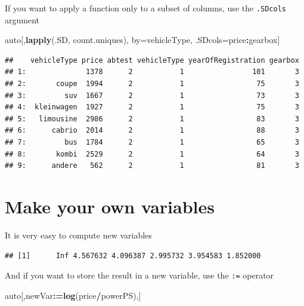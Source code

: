 \documentclass[]{book}
\newenvironment{Shaded}{\begin{snugshade}}{\end{snugshade}}
\newcommand{\CommentTok}[1]{\textcolor[rgb]{0.56,0.35,0.01}{\textit{#1}}}
\newcommand{\ErrorTok}[1]{\textcolor[rgb]{0.64,0.00,0.00}{\textbf{#1}}}
\newcommand{\KeywordTok}[1]{\textcolor[rgb]{0.13,0.29,0.53}{\textbf{#1}}}
\newcommand{\NormalTok}[1]{#1}
\newcommand{\OperatorTok}[1]{\textcolor[rgb]{0.81,0.36,0.00}{\textbf{#1}}}
\newcommand{\StringTok}[1]{\textcolor[rgb]{0.31,0.60,0.02}{#1}}
\theoremstyle{definition}
\theoremstyle{definition}
\theoremstyle{definition}
\theoremstyle{remark}
\begin{document}
If you want to apply a function only to a subset of columns, use the \texttt{.SDcols} argument

\begin{Shaded}
\begin{Highlighting}[]
\NormalTok{auto[,}\KeywordTok{lapply}\NormalTok{(.SD, count.uniques), by=vehicleType, .SDcols=price}\OperatorTok{:}\NormalTok{gearbox]}
\end{Highlighting}
\end{Shaded}

\begin{verbatim}
##    vehicleType price abtest vehicleType yearOfRegistration gearbox
## 1:              1378      2           1                101       3
## 2:       coupe  1994      2           1                 75       3
## 3:         suv  1667      2           1                 73       3
## 4:  kleinwagen  1927      2           1                 75       3
## 5:   limousine  2986      2           1                 83       3
## 6:      cabrio  2014      2           1                 88       3
## 7:         bus  1784      2           1                 65       3
## 8:       kombi  2529      2           1                 64       3
## 9:      andere   562      2           1                 81       3
\end{verbatim}

\hypertarget{make-your-own-variables}{%
\section{Make your own variables}\label{make-your-own-variables}}

It is very easy to compute new variables

\begin{Shaded}
\end{Shaded}

\begin{verbatim}
## [1]      Inf 4.567632 4.096387 2.995732 3.954583 1.852000
\end{verbatim}

And if you want to store the result in a new variable, use the \texttt{:=} operator

\begin{Shaded}
\begin{Highlighting}[]
\NormalTok{auto[,newVar}\OperatorTok{:}\ErrorTok{=}\KeywordTok{log}\NormalTok{(price}\OperatorTok{/}\NormalTok{powerPS),]}
\end{Highlighting}
\end{Shaded}
\end{document}
